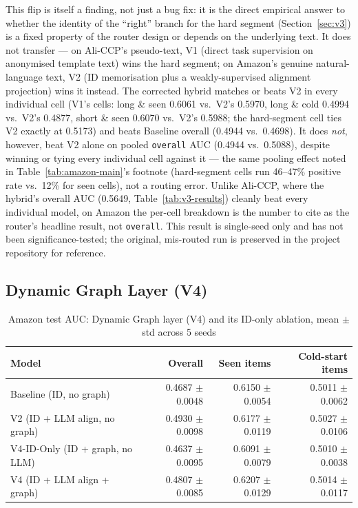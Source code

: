 \documentclass{uclthesis}
\begin{document}
This flip is itself a finding, not just a bug fix: it is the direct empirical answer to whether the identity of the ``right'' branch for the hard segment (Section~\ref{sec:v3}) is a fixed property of the router design or depends on the underlying text. It does not transfer --- on Ali-CCP's pseudo-text, V1 (direct task supervision on anonymised template text) wins the hard segment; on Amazon's genuine natural-language text, V2 (ID memorisation plus a weakly-supervised alignment projection) wins it instead. The corrected hybrid matches or beats V2 in every individual cell (V1's cells: long \& seen 0.6061 vs.\ V2's 0.5970, long \& cold 0.4994 vs.\ V2's 0.4877, short \& seen 0.6070 vs.\ V2's 0.5988; the hard-segment cell ties V2 exactly at 0.5173) and beats Baseline overall (0.4944 vs.\ 0.4698). It does \emph{not}, however, beat V2 alone on pooled \texttt{overall} AUC (0.4944 vs.\ 0.5088), despite winning or tying every individual cell against it --- the same pooling effect noted in Table~\ref{tab:amazon-main}'s footnote (hard-segment cells run 46--47\% positive rate vs.\ 12\% for seen cells), not a routing error. Unlike Ali-CCP, where the hybrid's overall AUC (0.5649, Table~\ref{tab:v3-results}) cleanly beat every individual model, on Amazon the per-cell breakdown is the number to cite as the router's headline result, not \texttt{overall}. This result is single-seed only and has not been significance-tested; the original, mis-routed run is preserved in the project repository for reference.

\subsection{Dynamic Graph Layer (V4)}
\label{sec:results-v4}

\begin{table}[h]
\centering
\caption{Amazon test AUC: Dynamic Graph layer (V4) and its ID-only ablation, mean $\pm$ std across 5 seeds}
\label{tab:v4-results}
\begin{tabular}{lrrr}
\toprule
Model & Overall & Seen items & Cold-start items \\
\midrule
Baseline (ID, no graph)              & 0.4687 $\pm$ 0.0048 & 0.6150 $\pm$ 0.0054 & 0.5011 $\pm$ 0.0062 \\
V2 (ID + LLM align, no graph)        & 0.4930 $\pm$ 0.0098 & 0.6177 $\pm$ 0.0119 & 0.5027 $\pm$ 0.0106 \\
V4-ID-Only (ID + graph, no LLM)      & 0.4637 $\pm$ 0.0095 & 0.6091 $\pm$ 0.0079 & 0.5010 $\pm$ 0.0038 \\
V4 (ID + LLM align + graph)          & 0.4807 $\pm$ 0.0085 & 0.6207 $\pm$ 0.0129 & 0.5014 $\pm$ 0.0117 \\
\bottomrule
\end{tabular}
\end{table}
\end{document}
